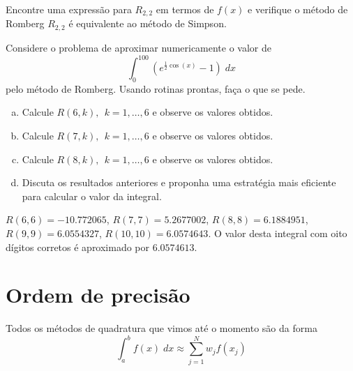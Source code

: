 \begin{exer}
Encontre uma expressão para $R_{2,2}$ em termos de $f(x)$ e verifique o método de Romberg $R_{2,2}$ é equivalente ao método de Simpson.
\end{exer}

\begin{exer}
Considere o problema de aproximar numericamente o valor de
$$\int_0^{100} \left(e^{\frac{1}{2}\cos(x)}-1\right)\;dx$$
pelo método de Romberg. Usando rotinas prontas, faça o que se pede.
\begin{enumerate}[a)]
\item Calcule $R(6,k),~~ k=1,\ldots,6$ e observe os valores obtidos.
\item Calcule $R(7,k),~~ k=1,\ldots,6$ e observe os valores obtidos.
\item Calcule $R(8,k),~~ k=1,\ldots,6$ e observe os valores obtidos.
\item Discuta os resultados anteriores e proponha uma estratégia mais eficiente para calcular o valor da integral.
\end{enumerate}
\end{exer}
\begin{resp}
  $R(6,6)=- 10.772065$, $R(7,7)=5.2677002$, $R(8,8)=6.1884951$, $R(9,9)=6.0554327$, $R(10,10)=6.0574643$. O valor desta integral com oito dígitos corretos é aproximado por  $6.0574613$.
\end{resp}

\section{Ordem de precisão}

Todos os métodos de quadratura que vimos até o momento são da forma
$$\int_a^b f(x)\;dx \approx \sum_{j=1}^N w_j f(x_j)$$

